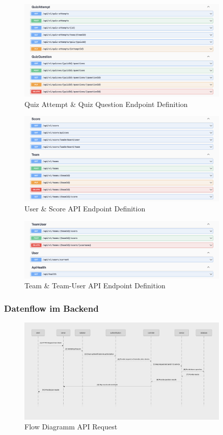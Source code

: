 \begin{figure}[H]
  \centering
  \includegraphics[width=0.9\textwidth]{img/QuizAttempt_QuizQuestion-Endpoint.png}
  \caption{Quiz Attempt \& Quiz Question Endpoint Definition}
\end{figure}



\begin{figure}[H]
  \centering
  \includegraphics[width=0.9\textwidth]{img/Score_Team-Endpoint.png}
  \caption{User \& Score API Endpoint Definition}
\end{figure}


\begin{figure}[H]
  \centering
  \includegraphics[width=0.9\textwidth]{img/TeamUser_User-Endpoint.png}
  \caption{Team \& Team-User API Endpoint Definition}
\end{figure}

\subsubsection{Datenflow im Backend}

\begin{figure}[H]
  \centering
  \includegraphics[width=0.9\textwidth]{img/Backend-Flow.png}
  \caption{Flow Diagramm API Request}
\end{figure}


